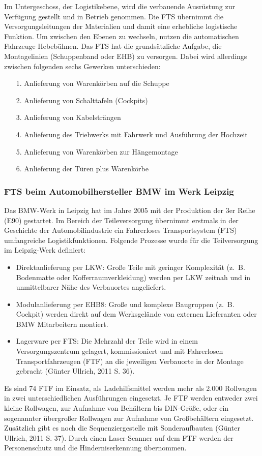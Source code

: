 Im Untergeschoss, der Logistikebene, wird die verbauende Ausr\"ustung zur Verf\"ugung gestellt und in Betrieb genommen.
Die FTS \"ubernimmt die Versorgungsleitungen der Materialien und damit eine erhebliche logistische Funktion.
Um zwischen den Ebenen zu wechseln, nutzen die automatischen Fahrzeuge Hebeb\"uhnen.
Das FTS hat die grunds\"atzliche Aufgabe, die Montagelinien (Schuppenband oder EHB) zu versorgen.
Dabei wird allerdings zwischen folgenden sechs Gewerken unterschieden:
\begin{itemize}
\item[1.] Anlieferung von Warenk\"orben auf die Schuppe
\item[2.] Anlieferung von Schalttafeln (Cockpits)
\item[3.] Anlieferung von Kabelstr\"angen
\item[4.] Anlieferung des Triebwerks mit Fahrwerk und Ausf\"uhrung der Hochzeit
\item[5.] Anlieferung von Warenk\"orben zur H\"angemontage
\item[6.] Anlieferung der T\"uren plus Warenk\"orbe
\end{itemize}
\subsubsection{FTS beim Automobilhersteller BMW im Werk Leipzig}
Das BMW-Werk in Leipzig hat im Jahre 2005 mit der Produktion der 3er Reihe (E90) gestartet.
Im Bereich der Teileversorgung \"ubernimmt erstmals in der Geschichte der Automobilindustrie ein Fahrerloses Transportsystem (FTS) umfangreiche Logistikfunktionen.
Folgende Prozesse wurde f\"ur die Teilversorgung im Leipzig-Werk definiert:

\begin{itemize}
\item Direktanlieferung per LKW:
Gro\ss e Teile mit geringer Komplexit\"at (z.~B. Bodenmatte oder Kofferraumverkleidung) werden per LKW zeitnah und in unmittelbarer N\"ahe des Verbauortes angeliefert.
\item Modulanlieferung per EHB8:
Gro\ss e und komplexe Baugruppen (z.~B. Cockpit) werden direkt auf dem Werksgel\"ande von externen Lieferanten oder BMW Mitarbeitern montiert.
\item Lagerware per FTS:
Die Mehrzahl der Teile wird in einem Versorgungszentrum gelagert, kommissioniert und mit Fahrerlosen Transportfahrzeugen (FTF) an die jeweiligen Verbauorte in der Montage gebracht (G\"unter Ullrich, 2011 S. 36).\end{itemize}
Es sind 74 FTF im Einsatz, als Ladehilfsmittel werden mehr als 2.000 Rollwagen in zwei unterschiedlichen Ausf\"uhrungen eingesetzt.
Je FTF werden entweder zwei kleine Rollwagen, zur Aufnahme von Beh\"altern bis DIN-Gr\"o\ss e, oder ein sogenannter \"ubergro\ss er Rollwagen zur Aufnahme von Gro\ss beh\"altern eingesetzt.
Zus\"atzlich gibt es noch die Sequenziergestelle mit Sonderaufbauten (G\"unter Ullrich, 2011 S. 37).
Durch einen Laser-Scanner auf dem FTF werden der Personenschutz und die Hinderniserkennung \"ubernommen. 

